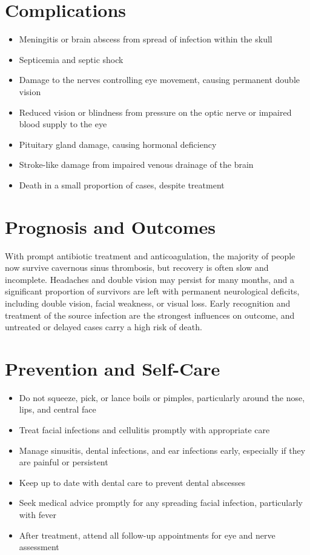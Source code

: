 \section*{Complications}
\begin{itemize}
    \item Meningitis or brain abscess from spread of infection within the skull
    \item Septicemia and septic shock
    \item Damage to the nerves controlling eye movement, causing permanent double vision
    \item Reduced vision or blindness from pressure on the optic nerve or impaired blood supply to the eye
    \item Pituitary gland damage, causing hormonal deficiency
    \item Stroke-like damage from impaired venous drainage of the brain
    \item Death in a small proportion of cases, despite treatment
\end{itemize}

\section*{Prognosis and Outcomes}
With prompt antibiotic treatment and anticoagulation, the majority of people now survive cavernous sinus thrombosis, but recovery is often slow and incomplete. Headaches and double vision may persist for many months, and a significant proportion of survivors are left with permanent neurological deficits, including double vision, facial weakness, or visual loss. Early recognition and treatment of the source infection are the strongest influences on outcome, and untreated or delayed cases carry a high risk of death.

\section*{Prevention and Self-Care}
\begin{itemize}
    \item Do not squeeze, pick, or lance boils or pimples, particularly around the nose, lips, and central face
    \item Treat facial infections and cellulitis promptly with appropriate care
    \item Manage sinusitis, dental infections, and ear infections early, especially if they are painful or persistent
    \item Keep up to date with dental care to prevent dental abscesses
    \item Seek medical advice promptly for any spreading facial infection, particularly with fever
    \item After treatment, attend all follow-up appointments for eye and nerve assessment
\end{itemize}

